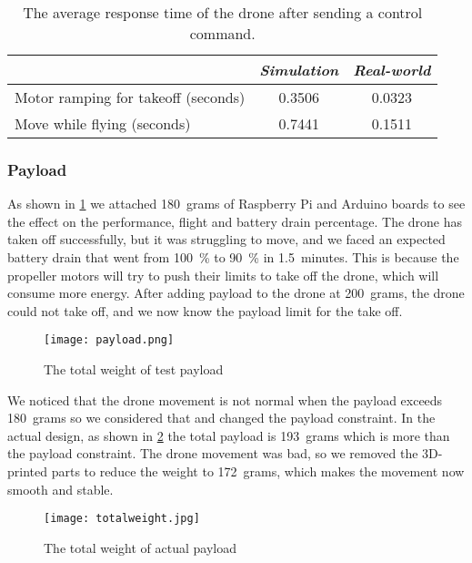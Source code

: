 \documentclass[../main.tex]{subfiles}
\begin{document}
\begin{table}[tbp]
	\centering
	\caption{The average response time of the drone after sending a control command.}
	\label{tab:response-time}
	\begin{tabularx}{0.7\textwidth}{ X c c }
		\toprule
		\textit{} & \textit{Simulation} & \textit{Real-world}\\ \midrule
		Motor ramping for takeoff (seconds)  & 0.3506 & 0.0323     \\
		Move while flying (seconds) & 0.7441  & 0.1511   \\
		\bottomrule
	\end{tabularx}
\end{table} 

\subsubsection{Payload}

As shown in \cref{fig:payload}
we attached \SI{180}{grams} of Raspberry Pi and Arduino boards
to see the effect on the performance, flight and
battery drain percentage. 
The drone has taken off successfully, 
but it was struggling to move, and we faced an expected 
battery drain that went from 
\SI{100}{\percent} to \SI{90}{\percent} in 
\SI{1.5}{minutes}. This is because the propeller motors will try to push 
their limits to take off the drone, which will consume more energy.
After adding payload to the drone at \SI{200}{grams}, the drone could not
take off, and we now know the payload limit for the take off. 

\begin{figure}[bp]
	\centering
	\texttt{[image: payload.png]}
	\caption{The total weight of test payload}
	\label{fig:payload}
\end{figure} 

We noticed that the drone movement
is not normal when the payload exceeds \SI{180}{grams} 
so we considered that and changed
the payload constraint. In the actual design, as shown in 
\cref{fig:actual-total-weight} the total payload 
is \SI{193}{grams} which is more than the payload constraint. 
The drone movement was bad, so we removed the 3D-printed
parts to reduce the weight to \SI{172}{grams}, 
which makes the movement now smooth and stable.

\begin{figure}[H]
	\centering
	\texttt{[image: totalweight.jpg]}
	\caption{The total weight of actual payload}
	\label{fig:actual-total-weight}
\end{figure} 
\end{document}
